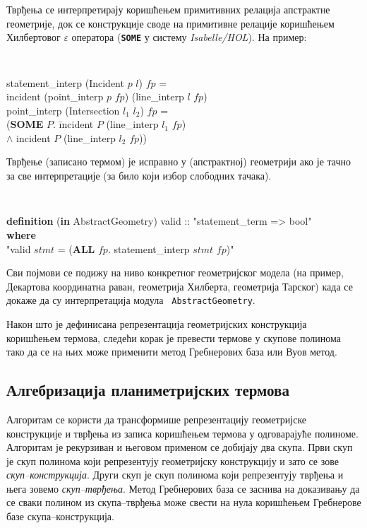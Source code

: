 Тврђења се интерпретирају коришћењем примитивних релација апстрактне
геометрије, док се конструкције своде на примитивне релације
коришћењем Хилбертовог $\varepsilon$ оператора ({\tt \textbf{SOME}} у
систему \emph{Isabelle/HOL}). На пример: {\tt
\begin{tabbing}
sta\=tement\_interp (Incident $p$ $l$) $fp$ = \\
   \>incident (point\_interp $p$ $fp$) (line\_interp $l$ $fp$) \\
point\_interp (Intersection $l_1$ $l_2$) $fp$ = \\
   \>(\textbf{SOME} $P$. \= incident $P$ (line\_interp $l_1$ $fp$) \\
   \>                    \> $\land$ incident $P$ (line\_interp $l_2$ $fp$))
\end{tabbing}
}

Тврђење (записано термом) је исправно у (апстрактној) геометрији ако
је тачно за све интерпретације (за било који избор слободних тачака).

{\tt 
\begin{tabbing}
\textbf{defi}\=\textbf{nition} (\textbf{in} AbstractGeometry) valid :: "statement\_term => bool" \\
  \textbf{where} \\
  \> "valid $stmt$ = (\textbf{ALL} $fp$. statement\_interp $stmt$ $fp$)"
\end{tabbing}
}

Сви појмови се подижу на ниво конкретног геометријског модела (на
пример, Декартова координатна раван, геометрија Хилберта, геометрија
Тарског) када се докаже да су интерпретација модула {\tt
  AbstractGeometry}.

Након што је дефинисана репрезентација геометријских конструкција
коришћењем термова, следећи корак је превести термове у скупове
полинома тако да се на њих може применити метод Гребнерових база или
Вуов метод.


\subsection{Алгебризација планиметријских термова}

Алгоритам се користи да трансформише репрезентацију геометријске
конструкције и тврђења из записа коришћењем термова у одговарајуће
полиноме. Алгоритам је рекурзиван и његовом применом се добијају два
скупа. Први скуп је скуп полинома који репрезентују геометријску
конструкцију и зато се зове \emph{скуп--конструкција}. Други скуп је
скуп полинома који репрезентују тврђења и њега зовемо
\emph{скуп--тврђења}. Метод Гребнерових база се заснива на доказивању
да се сваки полином из скупа--тврђења може свести на нула коришћењем
Гребнерове базе скупа--конструкција.

